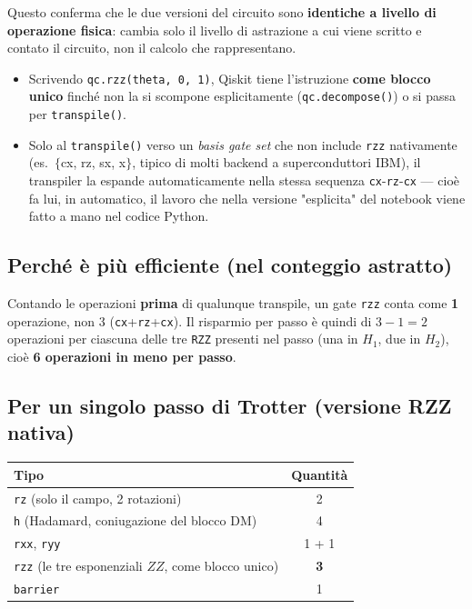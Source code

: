 \documentclass[11pt,a4paper]{article}
\begin{document}
Questo conferma che le due versioni del circuito sono \textbf{identiche
a livello di operazione fisica}: cambia solo il livello di astrazione a
cui viene scritto e contato il circuito, non il calcolo che
rappresentano.

\begin{itemize}[leftmargin=1.3em,itemsep=0.2em]
\item Scrivendo \texttt{qc.rzz(theta, 0, 1)}, Qiskit tiene l'istruzione
\textbf{come blocco unico} finché non la si scompone esplicitamente
(\texttt{qc.decompose()}) o si passa per \texttt{transpile()}.
\item Solo al \texttt{transpile()} verso un \emph{basis gate set} che
non include \texttt{rzz} nativamente (es.\ $\{$cx, rz, sx, x$\}$,
tipico di molti backend a superconduttori IBM), il transpiler la
espande automaticamente nella stessa sequenza \texttt{cx}-\texttt{rz}-\texttt{cx}
--- cioè fa lui, in automatico, il lavoro che nella versione
"esplicita" del notebook viene fatto a mano nel codice Python.
\end{itemize}

\subsection*{Perché è più efficiente (nel conteggio astratto)}

Contando le operazioni \textbf{prima} di qualunque transpile, un gate
\texttt{rzz} conta come \textbf{1} operazione, non 3
(\texttt{cx}+\texttt{rz}+\texttt{cx}). Il risparmio per passo è quindi
di $3-1=2$ operazioni per ciascuna delle tre \texttt{RZZ} presenti nel
passo (una in $H_1$, due in $H_2$), cioè \textbf{6 operazioni in meno
per passo}.

\subsection*{Per un singolo passo di Trotter (versione RZZ nativa)}

\begin{center}
\renewcommand{\arraystretch}{1.25}
\begin{tabular}{@{}lc@{}}
\toprule
\rowcolor{inkblue!10}
\textbf{Tipo} & \textbf{Quantità}\\
\midrule
\texttt{rz} (solo il campo, 2 rotazioni) & 2\\
\texttt{h} (Hadamard, coniugazione del blocco DM) & 4\\
\texttt{rxx}, \texttt{ryy} & 1 + 1\\
\texttt{rzz} (le tre esponenziali $ZZ$, come blocco unico) & \textbf{3}\\
\texttt{barrier} & 1\\
\bottomrule
\end{tabular}
\end{center}
\end{document}

